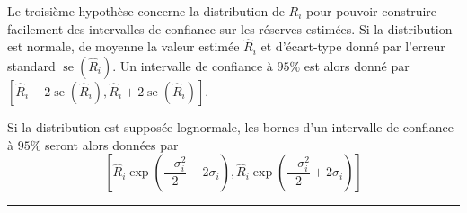 \begin{f}
%

		

Le troisième hypothèse concerne la distribution de \(R_{i}\) pour pouvoir construire facilement des intervalles de confiance sur les réserves estimées. Si  la distribution est normale, de moyenne la valeur estimée \(\hat{R}_{i}\) et d'écart-type donné par l'erreur standard \(\operatorname{se}\left(\hat{R}_{i}\right)\). Un intervalle de confiance à \(95 \%\) est alors donné par \(\left[\hat{R}_{i}-2 \operatorname{se}\left(\hat{R}_{i}\right), \hat{R}_{i}+2 \operatorname{se}\left(\hat{R}_{i}\right)\right]\).

Si la distribution est supposée lognormale, les bornes d'un intervalle de confiance à \(95 \%\) seront alors données par
\[
\left[\hat{R}_{i} \exp \left(\frac{-\sigma_{i}^{2}}{2}-2 \sigma_{i}\right), \hat{R}_{i} \exp \left(\frac{-\sigma_{i}^{2}}{2}+2 \sigma_{i}\right)\right]
\]
		
\end{f}
\hrule


